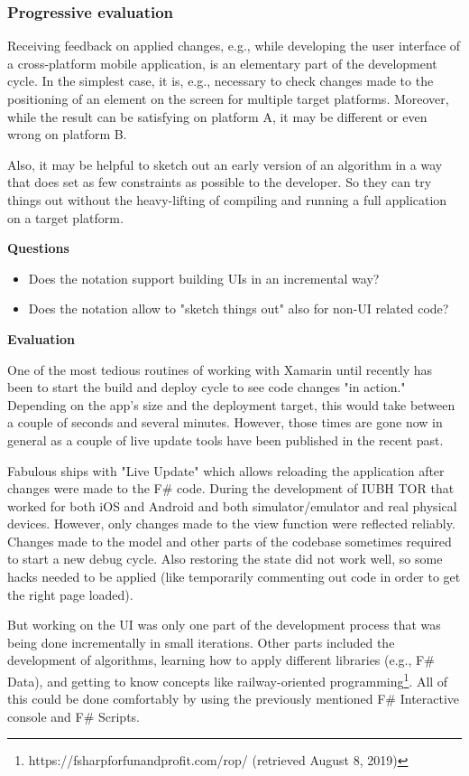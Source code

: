 \subsubsection{Progressive evaluation}

Receiving feedback on applied changes, e.g., while developing the user interface of a cross-platform mobile application, is an elementary part of the development cycle. In the simplest case, it is, e.g., necessary to check changes made to the positioning of an element on the screen for multiple target platforms. Moreover, while the result can be satisfying on platform A, it may be different or even wrong on platform B. 

Also, it may be helpful to sketch out an early version of an algorithm in a way that does set as few constraints as possible to the developer. So they can try things out without the heavy-lifting of compiling and running a full application on a target platform.

\textbf{Questions}

\begin{itemize}
\item Does the notation support building UIs in an incremental way?
\item Does the notation allow to "sketch things out" also for non-UI related code?
\end{itemize}

\textbf{Evaluation}

One of the most tedious routines of working with Xamarin until recently has been to start the build and deploy cycle to see code changes "in action." Depending on the app's size and the deployment target, this would take between a couple of seconds and several minutes. However, those times are gone now in general as a couple of live update tools have been published in the recent past.

Fabulous ships with "Live Update" which allows reloading the application after changes were made to the F\# code. During the development of IUBH TOR that worked for both iOS and Android and both simulator/emulator and real physical devices. However, only changes made to the view function were reflected reliably. Changes made to the model and other parts of the codebase sometimes required to start a new debug cycle. Also restoring the state did not work well, so some hacks needed to be applied (like temporarily commenting out code in order to get the right page loaded).

But working on the UI was only one part of the development process that was being done incrementally in small iterations. Other parts included the development of algorithms, learning how to apply different libraries (e.g., F\# Data), and getting to know concepts like railway-oriented programming\footnote{https://fsharpforfunandprofit.com/rop/ (retrieved August 8, 2019)}. All of this could be done comfortably by using the previously mentioned F\# Interactive console and F\# Scripts. 

